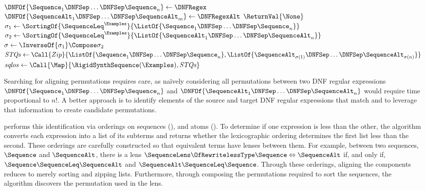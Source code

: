 \documentclass[sigplan,acmsmall]{acmart}
\begin{document}
\begin{algorithm}
\begin{algorithmic}[1]
    \Statex

    \Function{\RigidSynth}{$\DNFRegex,\DNFRegexAlt,\Examples$}
    \State $\DNFOf{\Sequence_1 \DNFSep \ldots \DNFSep \Sequence_n} \gets
    \DNFRegex$
    \State $\DNFOf{\SequenceAlt_1 \DNFSep \ldots \DNFSep \SequenceAlt_m} \gets
    \DNFRegexAlt$
    \State $\ReturnVal{\None}$
    \EndIf
    \State $\sigma_1 \gets
    \SortingOf{\SequenceLeq^\Examples}{\ListOf{\Sequence_1 \DNFSep \ldots
        \DNFSep \Sequence_n}}$
    \State $\sigma_2 \gets
    \SortingOf{\SequenceLeq^\Examples}{\ListOf{\SequenceAlt_1 \DNFSep \ldots
        \DNFSep \SequenceAlt_n}}$
    \State $\sigma \gets \InverseOf{\sigma_1} \Compose \sigma_2$
    \State $\mathit{STQs} \gets
    \Call{Zip}{\ListOf{\Sequence_1 \DNFSep \ldots \DNFSep
        \Sequence_n},\ListOf{\SequenceAlt_{\sigma(1)} \DNFSep \ldots \DNFSep \SequenceAlt_{\sigma(n)}}}$
    \State $\mathit{sqlos} \gets
    \Call{\Map}{\RigidSynthSequence(\Examples),\mathit{STQs}}$
    \EndCaseTwo
    \CaseTwo {\None}{$\ReturnVal{\None}$}
    \EndCaseTwo
    \EndSwitch
    \EndFunction
  \end{algorithmic}
\end{algorithm}

Searching for aligning permutations requires care, as na\"{i}vely
considering all permutations between two DNF regular
expressions $\DNFOf{\Sequence_1 \DNFSep \ldots \DNFSep \Sequence_n}$ and
$\DNFOf{\SequenceAlt_1 \DNFSep \ldots \DNFSep \SequenceAlt_n}$ would require time
proportional to $n!$.  A better approach is to identify elements of
the source and target DNF regular expressions that match and to
leverage that information to create candidate permutations.

\RigidSynth{} performs this identification via orderings on
sequences (\SequenceLeq), and atoms (\AtomLeq).
To determine if one expression is less than the other, the algorithm converts
each expression into a list of its subterms and returns whether the
lexicographic ordering determines the first list less than the second.
These orderings are carefully constructed so that equivalent terms have lenses
between them.  For
example, between two sequences, $\Sequence$ and $\SequenceAlt$, there is a lens
$\SequenceLens \OfRewritelessType \Sequence \Leftrightarrow \SequenceAlt$ if,
and only if, $\Sequence \SequenceLeq \SequenceAlt$ and $\SequenceAlt
\SequenceLeq \Sequence$.  Through these orderings, aligning the components
reduces to merely sorting and zipping lists.  Furthermore, through composing the
permutations required to sort the sequences, the algorithm discovers the
permutation used in the lens.
\end{document}
